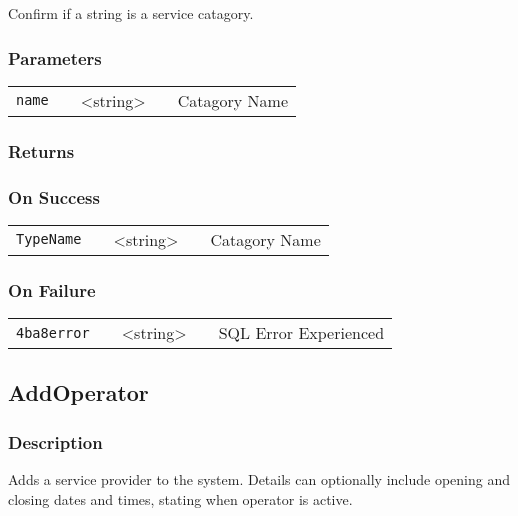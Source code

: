 \documentclass[a4paper,12pt]{article}
\begin{document}
Confirm if a string is a service catagory.

\subsubsection{Parameters}

\begin{tabular}{ccccc}
\verb!name! & \vspace{15mm} & <string> & \vspace{15mm} & Catagory Name \\
\end{tabular}

\subsubsection{Returns}

\subsubsection{On Success}

\begin{tabular}{ccccc}
\verb!TypeName! & \vspace{15mm} & <string> & \vspace{15mm} & Catagory Name \\
\end{tabular}
\subsubsection{On Failure}

\begin{tabular}{ccccc}
\verb!4ba8error! & \vspace{15mm} & <string> & \vspace{15mm} & SQL Error Experienced \\
\end{tabular}


\subsection{AddOperator}

\subsubsection{Description}

Adds a service provider to the system. Details can optionally include
opening and closing dates and times, stating when operator is active.  
\end{document}
